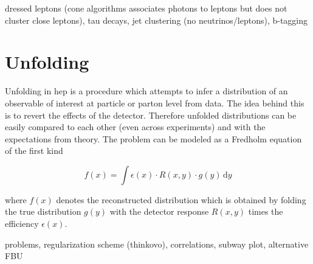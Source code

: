 dressed leptons (cone algorithms associates photons to leptons but does not cluster close leptons), tau decays, jet clustering (no neutrinos/leptons), b-tagging



\section{Unfolding}

Unfolding in \gls{hep} is a procedure which attempts to infer a distribution of an observable of interest at particle or parton level from data. The idea behind this is to revert the effects of the detector. Therefore unfolded distributions can be easily compared to each other (even across experiments) and with the expectations from theory. The problem can be modeled as a Fredholm equation of the first kind

\begin{equation}
f(x)=\int \epsilon(x)\cdot R(x,y)\cdot g(y)\, \mathrm{d}y
\end{equation}

where $f(x)$ denotes the reconstructed distribution which is obtained by folding the true distribution $g(y)$ with the detector response $R(x,y)$ times the efficiency $\epsilon(x)$.

problems, regularization scheme (thinkovo), correlations, subway plot, alternative FBU
